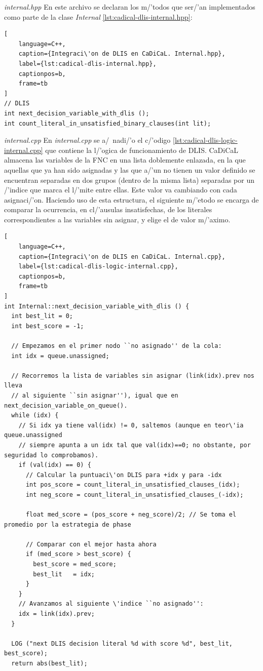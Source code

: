 {\textit{internal.hpp}}
En este archivo se declaran los m/'todos que ser/'an implementados como parte de la clase \textit{Internal} \ref{lst:cadical-dlis-internal.hpp}:

\begin{lstlisting}[
    language=C++,
    caption={Integraci\'on de DLIS en CaDiCaL. Internal.hpp},
    label={lst:cadical-dlis-internal.hpp},
    captionpos=b,
    frame=tb
]
// DLIS
int next_decision_variable_with_dlis ();
int count_literal_in_unsatisfied_binary_clauses(int lit);

\end{lstlisting}

{\textit{internal.cpp}}
En \textit{internal.cpp} se a/~nadi/'o el c/'odigo \ref{lst:cadical-dlis-logic-internal.cpp} que contiene la l/'ogica de funcionamiento de DLIS.
CaDiCaL almacena las variables de la FNC en una lista doblemente enlazada, en la que aquellas que ya han sido asignadas y las que a/'un no tienen un valor definido se encuentran separadas en dos grupos (dentro de la misma lista) separadas por un /'indice que marca el l/'mite entre ellas. Este valor va cambiando con cada asignaci/'on. Haciendo uso de esta estructura, el siguiente m/'etodo se encarga de comparar la ocurrencia, en cl/'ausulas insatisfechas, de los literales correspondientes a las variables sin asignar, y elige el de valor m/'aximo.

\begin{lstlisting}[
    language=C++,
    caption={Integraci\'on de DLIS en CaDiCaL. Internal.cpp},
    label={lst:cadical-dlis-logic-internal.cpp},
    captionpos=b,
    frame=tb
]
int Internal::next_decision_variable_with_dlis () {
  int best_lit = 0;
  int best_score = -1;

  // Empezamos en el primer nodo ``no asignado'' de la cola:
  int idx = queue.unassigned;

  // Recorremos la lista de variables sin asignar (link(idx).prev nos lleva
  // al siguiente ``sin asignar''), igual que en next_decision_variable_on_queue().
  while (idx) {
    // Si idx ya tiene val(idx) != 0, saltemos (aunque en teor\'ia queue.unassigned
    // siempre apunta a un idx tal que val(idx)==0; no obstante, por seguridad lo comprobamos).
    if (val(idx) == 0) {
      // Calcular la puntuaci\'on DLIS para +idx y para -idx
      int pos_score = count_literal_in_unsatisfied_clauses_(idx);
      int neg_score = count_literal_in_unsatisfied_clauses_(-idx);

      float med_score = (pos_score + neg_score)/2; // Se toma el promedio por la estrategia de phase

      // Comparar con el mejor hasta ahora
      if (med_score > best_score) {
        best_score = med_score;
        best_lit   = idx;    
      }      
    }
    // Avanzamos al siguiente \'indice ``no asignado'':
    idx = link(idx).prev;
  }

  LOG ("next DLIS decision literal %d with score %d", best_lit, best_score);
  return abs(best_lit);

\end{lstlisting}

